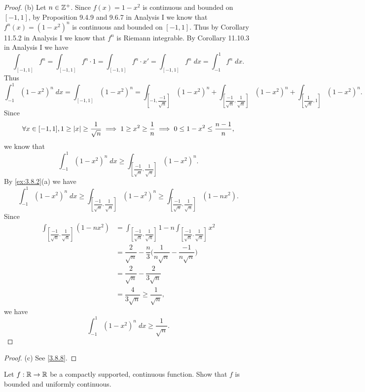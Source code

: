 \begin{proof}{(b)}
  Let \(n \in \mathbb{Z}^+\).
  Since \(f(x) = 1 - x^2\) is continuous and bounded on \([-1, 1]\), by Proposition 9.4.9 and 9.6.7 in Analysis I we know that \(f^n(x) = (1 - x^2)^n\) is continuous and bounded on \([-1, 1]\).
  Thus by Corollary 11.5.2 in Analysis I we know that \(f^n\) is Riemann integrable.
  By Corollary 11.10.3 in Analysis I we have
  \[
    \int_{[-1, 1]} f^n = \int_{[-1, 1]} f^n \cdot 1 = \int_{[-1, 1]} f^n \cdot x' = \int_{[-1, 1]} f^n \; dx = \int_{-1}^1 f^n \; dx.
  \]
  Thus
  \[
    \int_{-1}^1 (1 - x^2)^n \; dx = \int_{[-1, 1]} (1 - x^2)^n = \int_{[-1, \dfrac{-1}{\sqrt{n}}]} (1 - x^2)^n + \int_{[\dfrac{-1}{\sqrt{n}}, \dfrac{1}{\sqrt{n}}]} (1 - x^2)^n + \int_{[\dfrac{1}{\sqrt{n}}, 1]} (1 - x^2)^n.
  \]
  Since
  \[
    \forall x \in [-1, 1], 1 \geq \left\lvert x\right\rvert \geq \dfrac{1}{\sqrt{n}} \implies 1 \geq x^2 \geq \dfrac{1}{n} \implies 0 \leq 1 - x^2 \leq \dfrac{n - 1}{n},
  \]
  we know that
  \[
    \int_{-1}^1 (1 - x^2)^n \; dx \geq \int_{[\dfrac{-1}{\sqrt{n}}, \dfrac{1}{\sqrt{n}}]} (1 - x^2)^n.
  \]
  By \cref{ex:3.8.2}(a) we have
  \[
    \int_{-1}^1 (1 - x^2)^n \; dx \geq \int_{[\dfrac{-1}{\sqrt{n}}, \dfrac{1}{\sqrt{n}}]} (1 - x^2)^n \geq \int_{[\dfrac{-1}{\sqrt{n}}, \dfrac{1}{\sqrt{n}}]} (1 - n x^2).
  \]
  Since
  \begin{align*}
    \int_{[\dfrac{-1}{\sqrt{n}}, \dfrac{1}{\sqrt{n}}]} (1 - n x^2) & = \int_{[\dfrac{-1}{\sqrt{n}}, \dfrac{1}{\sqrt{n}}]} 1 - n \int_{[\dfrac{-1}{\sqrt{n}}, \dfrac{1}{\sqrt{n}}]} x^2 \\
                                                                   & = \dfrac{2}{\sqrt{n}} - \dfrac{n}{3} \bigg(\dfrac{1}{n \sqrt{n}} - \dfrac{-1}{n \sqrt{n}}\bigg)                   \\
                                                                   & = \dfrac{2}{\sqrt{n}} - \dfrac{2}{3 \sqrt{n}}                                                                     \\
                                                                   & = \dfrac{4}{3 \sqrt{n}} \geq \dfrac{1}{\sqrt{n}},
  \end{align*}
  we have
  \[
    \int_{-1}^1 (1 - x^2)^n \; dx \geq \dfrac{1}{\sqrt{n}}.
  \]
\end{proof}

\begin{proof}{(c)}
  See \cref{3.8.8}.
\end{proof}

\begin{ex}\label{ex:3.8.3}
  Let \(f : \mathbb{R} \to \mathbb{R}\) be a compactly supported, continuous function.
  Show that \(f\) is bounded and uniformly continuous.
\end{ex}

